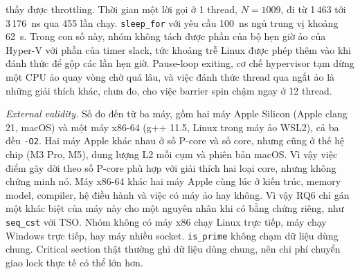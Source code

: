 thấy được throttling. Thời gian một lời gọi ở 1 thread, $N=1009$, đi từ 1\,463 tới 3\,176~ns qua 455
lần chạy. \texttt{sleep\_for} với yêu cầu 100~ns ngủ trung vị khoảng 62~\textmu s. Trong con số này,
nhóm không tách được phần của bộ hẹn giờ ảo của Hyper-V với phần của timer slack, tức khoảng trễ Linux
được phép thêm vào khi đánh thức để gộp các lần hẹn giờ. Pause-loop exiting, cơ chế hypervisor tạm dừng
một CPU ảo quay vòng chờ quá lâu, và việc đánh thức thread qua ngắt ảo là những giải thích khác, chưa
đo, cho việc barrier spin chậm ngay ở 12 thread.

\emph{External validity.} Số đo đến từ ba máy, gồm hai máy Apple Silicon (Apple clang 21, macOS) và một máy
x86-64 (g++ 11.5, Linux trong máy ảo WSL2), cả ba đều \texttt{-O2}. Hai máy Apple khác nhau ở số P-core
và số core, nhưng cũng ở thế hệ chip (M3 Pro, M5), dung lượng L2 mỗi cụm và phiên bản macOS. Vì vậy việc
điểm gãy dời theo số P-core phù hợp với giải thích hai loại core, nhưng không chứng minh nó. Máy x86-64
khác hai máy Apple cùng lúc ở kiến trúc, memory model, compiler, hệ điều hành và việc có máy ảo hay
không. Vì vậy RQ6 chỉ gán một khác biệt của máy này cho một nguyên nhân khi có bằng chứng riêng, như
\texttt{seq\_cst} với TSO. Nhóm không có máy x86 chạy Linux trực tiếp, máy chạy Windows trực tiếp, hay
máy nhiều socket. \texttt{is\_prime} không chạm dữ liệu dùng chung. Critical section thật thường ghi dữ
liệu dùng chung, nên chi phí chuyển giao lock thực tế có thể lớn hơn.
